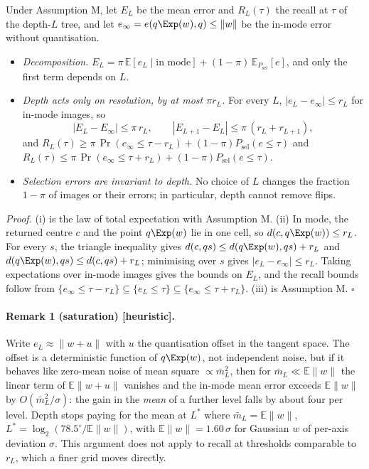 \begin{theorem}\label{thm:decomp}
Under Assumption M, let $E_L$ be the mean error and $R_L(\tau)$ the recall at $\tau$ of the depth-$L$ tree, and let $e_\infty=e(q\Exp(w),q)\le\|w\|$
be the in-mode error without quantisation.
\begin{itemize}
\item[(i)] \emph{Decomposition.} $E_L=\pi\,\mathbb E[e_L\mid\text{in mode}]+(1-\pi)\,\mathbb E_{P_{\mathrm{sel}}}[e]$, and only the first term depends on $L$.
\item[(ii)] \emph{Depth acts only on resolution, by at most $\pi r_L$.} For every $L$, $|e_L-e_\infty|\le r_L$ for in-mode images, so
\[
|E_L-E_\infty|\le\pi\,r_L,\qquad |E_{L+1}-E_L|\le\pi\,(r_L+r_{L+1}),
\]
and $R_L(\tau)\ge\pi\,\Pr(e_\infty\le\tau-r_L)+(1-\pi)P_{\mathrm{sel}}(e\le\tau)$
and $R_L(\tau)\le\pi\,\Pr(e_\infty\le\tau+r_L)+(1-\pi)P_{\mathrm{sel}}(e\le\tau)$.
\item[(iii)] \emph{Selection errors are invariant to depth.} No choice of $L$ changes the fraction $1-\pi$ of images or their errors;
in particular, depth cannot remove flips.
\end{itemize}
\end{theorem}

\noindent\emph{Proof.} (i) is the law of total expectation with Assumption M. (ii) In mode, the returned centre $c$ and the
point $q\Exp(w)$ lie in one cell, so $d(c,q\Exp(w))\le r_L$. For every $s$, the triangle inequality gives
$d(c,qs)\le d(q\Exp(w),qs)+r_L$ and $d(q\Exp(w),qs)\le d(c,qs)+r_L$; minimising over $s$ gives $|e_L-e_\infty|\le r_L$. Taking
expectations over in-mode images gives the bounds on $E_L$, and the recall bounds follow from
$\{e_\infty\le\tau-r_L\}\subseteq\{e_L\le\tau\}\subseteq\{e_\infty\le\tau+r_L\}$. (iii) is Assumption M. \hfill$\square$

\paragraph{Remark 1 (saturation) [heuristic].}
Write $e_L\approx\|w+u\|$ with $u$ the quantisation offset in the tangent space. The offset is a deterministic function of
$q\Exp(w)$, not independent noise, but if it behaves like zero-mean noise of mean square $\propto\bar m_L^2$, then for
$\bar m_L\ll\mathbb E\|w\|$ the linear term of $\mathbb E\|w+u\|$ vanishes and the in-mode mean error exceeds $\mathbb E\|w\|$ by
$O(\bar m_L^2/\sigma)$: the gain in the \emph{mean} of a further level falls by about four per level. Depth stops paying for
the mean at $L^\ast$ where $\bar m_L=\mathbb E\|w\|$, $L^\ast=\log_2(78.5^\circ/\mathbb E\|w\|)$, with $\mathbb E\|w\|=1.60\,\sigma$ for
Gaussian $w$ of per-axis deviation $\sigma$. This argument does not apply to recall at thresholds comparable to $r_L$,
which a finer grid moves directly.

